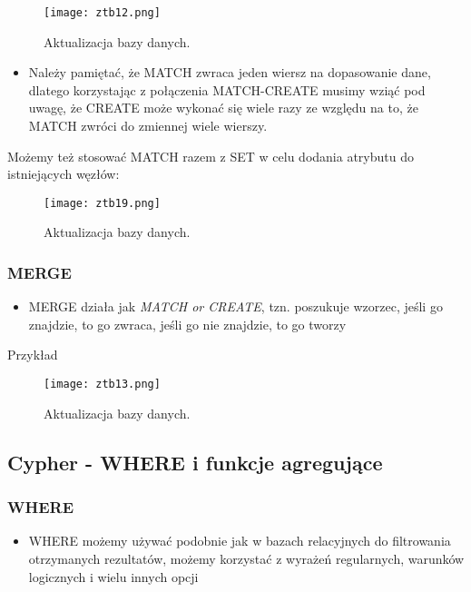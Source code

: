 \documentclass[a4paper,15pt]{article}
\begin{document}
\begin{figure}[H]
\centering
  \texttt{[image: ztb12.png]}
  \caption{Aktualizacja bazy danych.}
  \label{fig:nodes}
\end{figure}

\begin{itemize}
\item Należy pamiętać, że MATCH zwraca jeden wiersz na dopasowanie dane, dlatego korzystając z połączenia MATCH-CREATE musimy wziąć pod uwagę, że CREATE może wykonać się wiele razy ze względu na to, że MATCH zwróci do zmiennej wiele wierszy.
\end{itemize}

Możemy też stosować MATCH razem z SET w celu dodania atrybutu do istniejących węzłów:
\begin{figure}[H]
\centering
  \texttt{[image: ztb19.png]}
  \caption{Aktualizacja bazy danych.}
  \label{fig:nodes}
\end{figure}

\subsubsection{MERGE}

\begin{itemize}
\item MERGE działa jak \textit{MATCH or CREATE}, tzn. poszukuje wzorzec, jeśli go znajdzie, to go zwraca, jeśli go nie znajdzie, to go tworzy
\end{itemize}
Przykład
\begin{figure}[H]
\centering
  \texttt{[image: ztb13.png]}
  \caption{Aktualizacja bazy danych.}
  \label{fig:nodes}
\end{figure}

\subsection{Cypher - WHERE i funkcje agregujące}

\subsubsection{WHERE}
\begin{itemize}
\item WHERE możemy używać podobnie jak w bazach relacyjnych do filtrowania otrzymanych rezultatów, możemy korzystać z wyrażeń regularnych, warunków logicznych i wielu innych opcji 
\end{itemize}
\end{document}
